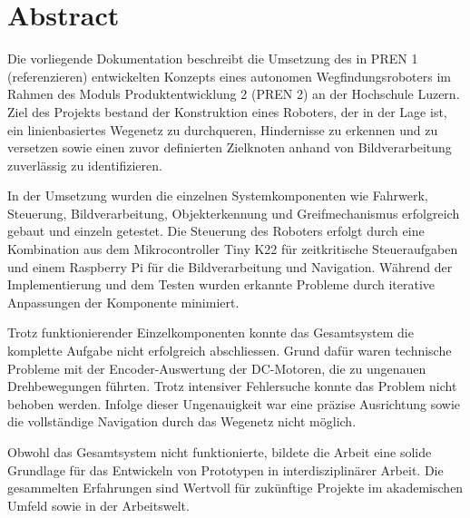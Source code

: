 \section*{Abstract}


Die vorliegende Dokumentation beschreibt die Umsetzung des in PREN 1 (referenzieren) entwickelten Konzepts eines autonomen Wegfindungsroboters im Rahmen des Moduls Produktentwicklung 2 (PREN 2) an der Hochschule Luzern. Ziel des Projekts bestand der Konstruktion eines Roboters, der in der Lage ist, ein linienbasiertes Wegenetz zu durchqueren, Hindernisse zu erkennen und zu versetzen sowie einen zuvor definierten Zielknoten anhand von Bildverarbeitung zuverlässig zu identifizieren.

In der Umsetzung wurden die einzelnen Systemkomponenten wie Fahrwerk, Steuerung, Bildverarbeitung, Objekterkennung und Greifmechanismus erfolgreich gebaut und einzeln getestet. Die Steuerung des Roboters erfolgt durch eine Kombination aus dem Mikrocontroller Tiny K22 für zeitkritische Steueraufgaben und einem Raspberry Pi für die Bildverarbeitung und Navigation. Während der Implementierung und dem Testen wurden erkannte Probleme durch iterative Anpassungen der Komponente minimiert.


Trotz funktionierender Einzelkomponenten konnte das Gesamtsystem die komplette Aufgabe nicht erfolgreich abschliessen. Grund dafür waren technische Probleme mit der Encoder-Auswertung der DC-Motoren, die zu ungenauen Drehbewegungen führten. Trotz intensiver Fehlersuche konnte das Problem nicht behoben werden. Infolge dieser Ungenauigkeit war eine präzise Ausrichtung sowie die vollständige Navigation durch das Wegenetz nicht möglich.

Obwohl das Gesamtsystem nicht funktionierte, bildete die Arbeit eine solide Grundlage für das Entwickeln von Prototypen in interdisziplinärer Arbeit. Die gesammelten Erfahrungen sind Wertvoll für zukünftige Projekte im akademischen Umfeld sowie in der Arbeitswelt.